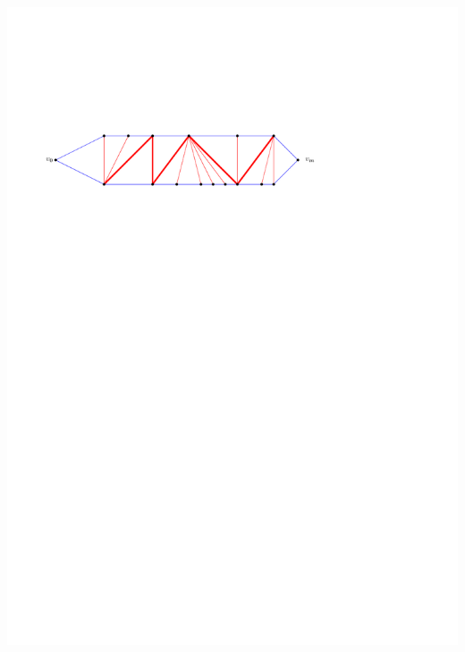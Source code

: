 \documentclass[a4paper]{article}
\begin{document}
\includegraphics[scale=.9]{rectangularDuals/img/fans}
\clearpage%
\end{document}
